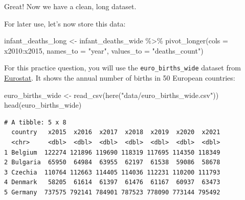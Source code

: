 \documentclass[
  letterpaper,
  DIV=11,
  numbers=noendperiod]{scrreprt}
\newenvironment{Shaded}{\begin{snugshade}}{\end{snugshade}}
\newcommand{\AttributeTok}[1]{\textcolor[rgb]{0.40,0.45,0.13}{#1}}
\newcommand{\FunctionTok}[1]{\textcolor[rgb]{0.28,0.35,0.67}{#1}}
\newcommand{\NormalTok}[1]{\textcolor[rgb]{0.00,0.23,0.31}{#1}}
\newcommand{\OtherTok}[1]{\textcolor[rgb]{0.00,0.23,0.31}{#1}}
\newcommand{\SpecialCharTok}[1]{\textcolor[rgb]{0.37,0.37,0.37}{#1}}
\newcommand{\StringTok}[1]{\textcolor[rgb]{0.13,0.47,0.30}{#1}}
\begin{document}
Great! Now we have a clean, long dataset.

For later use, let's now store this data:

\begin{Shaded}
\begin{Highlighting}[]
\NormalTok{infant\_deaths\_long }\OtherTok{\textless{}{-}} 
\NormalTok{  infant\_deaths\_wide }\SpecialCharTok{\%\textgreater{}\%} 
  \FunctionTok{pivot\_longer}\NormalTok{(}\AttributeTok{cols =}\NormalTok{ x2010}\SpecialCharTok{:}\NormalTok{x2015,}
               \AttributeTok{names\_to =} \StringTok{"year"}\NormalTok{, }
               \AttributeTok{values\_to =} \StringTok{"deaths\_count"}\NormalTok{)}
\end{Highlighting}
\end{Shaded}

\begin{tcolorbox}[enhanced jigsaw, colframe=quarto-callout-tip-color-frame, rightrule=.15mm, opacityback=0, breakable, coltitle=black, colbacktitle=quarto-callout-tip-color!10!white, bottomrule=.15mm, leftrule=.75mm, toprule=.15mm, arc=.35mm, bottomtitle=1mm, colback=white, left=2mm, opacitybacktitle=0.6, titlerule=0mm, title=\textcolor{quarto-callout-tip-color}{\faLightbulb}\hspace{0.5em}{Practice}, toptitle=1mm]

For this practice question, you will use the \texttt{euro\_births\_wide}
dataset from
\href{https://ec.europa.eu/eurostat/databrowser/view/tps00204/default/table}{Eurostat}.
It shows the annual number of births in 50 European countries:

\begin{Shaded}
\begin{Highlighting}[]
\NormalTok{euro\_births\_wide }\OtherTok{\textless{}{-}} 
  \FunctionTok{read\_csv}\NormalTok{(}\FunctionTok{here}\NormalTok{(}\StringTok{"data/euro\_births\_wide.csv"}\NormalTok{))}
\FunctionTok{head}\NormalTok{(euro\_births\_wide)}
\end{Highlighting}
\end{Shaded}

\begin{verbatim}
# A tibble: 5 x 8
  country   x2015  x2016  x2017  x2018  x2019  x2020  x2021
  <chr>     <dbl>  <dbl>  <dbl>  <dbl>  <dbl>  <dbl>  <dbl>
1 Belgium  122274 121896 119690 118319 117695 114350 118349
2 Bulgaria  65950  64984  63955  62197  61538  59086  58678
3 Czechia  110764 112663 114405 114036 112231 110200 111793
4 Denmark   58205  61614  61397  61476  61167  60937  63473
5 Germany  737575 792141 784901 787523 778090 773144 795492
\end{verbatim}


\end{tcolorbox}
\end{document}
